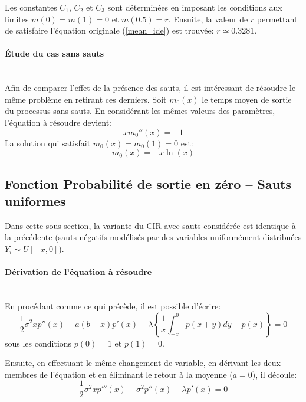 Les constantes $C_1$, $C_2$ et $C_3$ sont déterminées en imposant les conditions aux limites $m(0)=m(1)=0$ et $m(0.5)=r$. Ensuite, la valeur de $r$ permettant de satisfaire l'équation originale (\ref{mean_ide}) est trouvée: $r\simeq0.3281$.

\paragraph{Étude du cas sans sauts}\phantom{}\\
Afin de comparer l'effet de la présence des sauts, il est intéressant de résoudre le même problème en retirant ces derniers. Soit $m_0(x)$ le temps moyen de sortie du processus sans sauts. En considérant les mêmes valeurs des paramètres, l'équation à résoudre devient:
\begin{equation}\label{mean_3rd_order_without_jumps}
    xm_0''(x)=-1
\end{equation}
La solution qui satisfait $m_0(x)=m_0(1)=0$ est:
\begin{equation}\label{sol_mean_with_0_jumps}
    m_0(x)=-x\ln(x)
\end{equation}

\subsection{Fonction Probabilité de sortie en zéro -- Sauts uniformes}\label{subsection_probability_jumps}
Dans cette sous-section, la variante du \ac{CIR} avec sauts considérée est identique à la précédente (sauts négatifs modélisés par des variables uniformément distribuées $Y_i\sim U[-x,0]$).

\paragraph{Dérivation de l'équation à résoudre}\phantom{}\\
En procédant comme ce qui précède, il est possible d'écrire:
\begin{equation}
    \frac{1}{2}\sigma^2xp''(x)+a(b-x)p'(x)+\lambda\left\{\frac{1}{x}\int_{-x}^0p(x+y)dy-p(x)\right\}=0
\end{equation}
sous les conditions $p(0)=1$ et $p(1)=0$.

Ensuite, en effectuant le même changement de variable, en dérivant les deux membres de l'équation et en éliminant le retour à la moyenne ($a=0$), il découle:
\begin{equation}\label{probability_3rd_order}
    \frac{1}{2}\sigma^2xp'''(x)+\sigma^2p''(x)-\lambda p'(x)=0
\end{equation}
